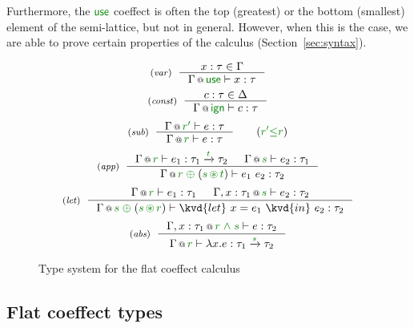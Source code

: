 Furthermore, the $\cunit$ coeffect is often the top (greatest) or the bottom (smallest) 
element of the semi-lattice, but not in general. However, when this is the case, we are able
to prove certain properties of the calculus (Section~\ref{sec:syntax}).


\begin{figure}[t]
\begin{equation*}
\tyrule{var}
  {x : \tau \in \Gamma}
  {\coctx{\Gamma}{\cunit} \vdash x : \tau }
\end{equation*}
\begin{equation*}
\tyrule{const}
  {c : \tau \in \Delta}
  {\coctx{\Gamma}{\czero} \vdash c : \tau }
\end{equation*}
\begin{equation*}
\tyrule{sub}
  {\coctx{\Gamma}{\cclrd{r'}} \vdash e : \tau }
  {\coctx{\Gamma}{\cclrd{r}} \vdash e : \tau }\quad\quad(\cclrd{r'} \cleq \cclrd{r})
\end{equation*}
\begin{equation*}
\tyrule{app}
  {\coctx{\Gamma}{\cclrd{r}} \vdash e_1 : \tau_1 \xrightarrow{\cclrd{t}} \tau_2 &
   \coctx{\Gamma}{\cclrd{s}} \vdash e_2 : \tau_1 }
  {\coctx{\Gamma}{\cclrd{r} \;\cpar\; (\cclrd{s} \,\cseq\, \cclrd{t})} \vdash e_1~e_2 : \tau_2}
\end{equation*}
\begin{equation*}
\tyrule{let}
  { \coctx{\Gamma}{\cclrd{r}} \vdash e_1 : \tau_1 &
    \coctx{\Gamma, x:\tau_1}{\cclrd{s}} \vdash e_2 : \tau_2}
  {\coctx{\Gamma}{\cclrd{s} \;\cpar\; (\cclrd{s} \,\cseq\, \cclrd{r})} \vdash \kvd{let}~x=e_1~\kvd{in}~e_2 : \tau_2 }
\end{equation*}
\begin{equation*}
\tyrule{abs}
  {\coctx{\Gamma, x:\tau_1}{\cclrd{r}\;\czip\;\cclrd{s}} \vdash e : \tau_2}
  {\coctx{\Gamma}{\cclrd{r}} \vdash \lambda x.e : \tau_1 \xrightarrow{\cclrd{s}} \tau_2 }
\end{equation*}

\caption{Type system for the flat coeffect calculus}
\label{fig:flat-types}
\end{figure}


\subsection{Flat coeffect types}

